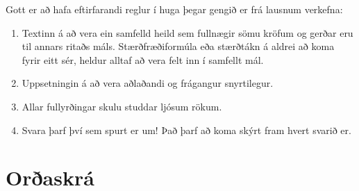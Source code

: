 \documentclass[a4paper,10pt,icelandic]{sphinxmanual}
\begin{document}
Gott er að hafa eftirfarandi reglur í huga þegar gengið er frá lausnum
verkefna:
\begin{enumerate}
\item {} 
Textinn á að vera ein samfelld heild sem fullnægir sömu kröfum og
gerðar eru til annars ritaðs máls. Stærðfræðiformúla eða stærðtákn á
aldrei að koma fyrir eitt sér, heldur alltaf að vera felt inn í samfellt
mál.

\item {} 
Uppsetningin á að vera aðlaðandi og frágangur snyrtilegur.

\item {} 
Allar fullyrðingar skulu studdar ljósum rökum.

\item {} 
Svara þarf því sem spurt er um! Það þarf að koma skýrt fram hvert
svarið er.

\end{enumerate}


\chapter{Orðaskrá}



\renewcommand{\indexname}{Atriðaskrá}
\printindex
\end{document}
